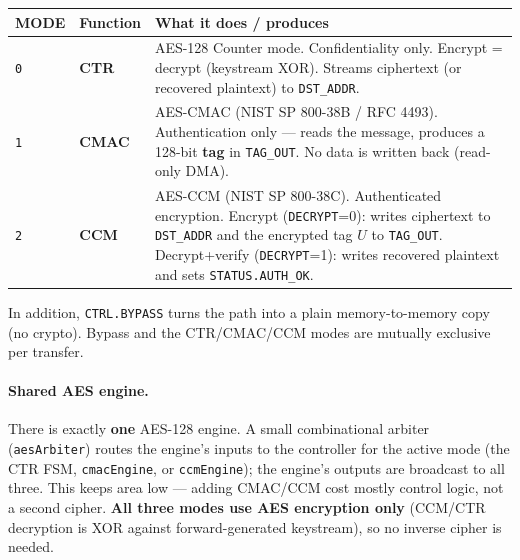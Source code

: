 \documentclass[11pt,a4paper]{article}
\newcommand{\reg}[1]{\texttt{#1}}
\newcommand{\bit}[1]{\texttt{#1}}
\begin{document}
\begin{longtable}{@{}p{} p{} p{}@{}}
\hline
\textbf{MODE} & \textbf{Function} & \textbf{What it does / produces} \\ \hline \endhead
\texttt{0} & \textbf{CTR}  & AES-128 Counter mode. Confidentiality only. Encrypt = decrypt
  (keystream XOR). Streams ciphertext (or recovered plaintext) to \reg{DST\_ADDR}. \\ \hline
\texttt{1} & \textbf{CMAC} & AES-CMAC (NIST SP 800-38B / RFC 4493). Authentication only ---
  reads the message, produces a 128-bit \textbf{tag} in \reg{TAG\_OUT}. No data is written
  back (read-only DMA). \\ \hline
\texttt{2} & \textbf{CCM}  & AES-CCM (NIST SP 800-38C). Authenticated encryption. Encrypt
  (\bit{DECRYPT}=0): writes ciphertext to \reg{DST\_ADDR} and the encrypted tag \(U\) to
  \reg{TAG\_OUT}. Decrypt+verify (\bit{DECRYPT}=1): writes recovered plaintext and sets
  \bit{STATUS.AUTH\_OK}. \\ \hline
\end{longtable}

\noindent In addition, \bit{CTRL.BYPASS} turns the path into a plain memory-to-memory copy
(no crypto). Bypass and the CTR/CMAC/CCM modes are mutually exclusive per transfer.

\paragraph{Shared AES engine.} There is exactly \textbf{one} AES-128 engine. A small
combinational arbiter (\reg{aesArbiter}) routes the engine's inputs to the controller for the
active mode (the CTR FSM, \reg{cmacEngine}, or \reg{ccmEngine}); the engine's outputs are
broadcast to all three. This keeps area low --- adding CMAC/CCM cost mostly control logic, not
a second cipher. \textbf{All three modes use AES encryption only} (CCM/CTR decryption is XOR
against forward-generated keystream), so no inverse cipher is needed.
\end{document}
